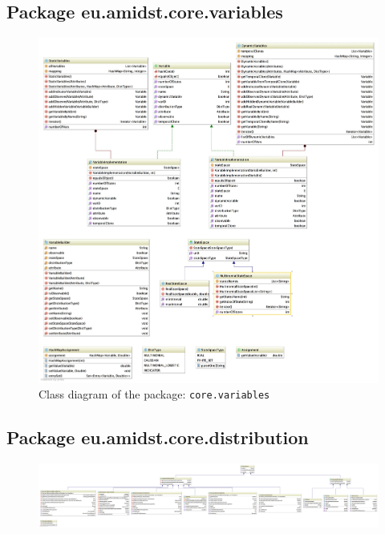\subsection{Package eu.amidst.core.variables}

\begin{figure}[H]
  \caption{Class diagram of the package: \texttt{core.variables}}
  \centering
    \includegraphics[width=\textwidth]{ClassDiagrams/core_variables.jpg}
\end{figure}

\subsection{Package eu.amidst.core.distribution}

\begin{figure}[H]
  \centering
    \includegraphics[width=\textwidth]{ClassDiagrams/core_distribution.jpg}
\end{figure}



